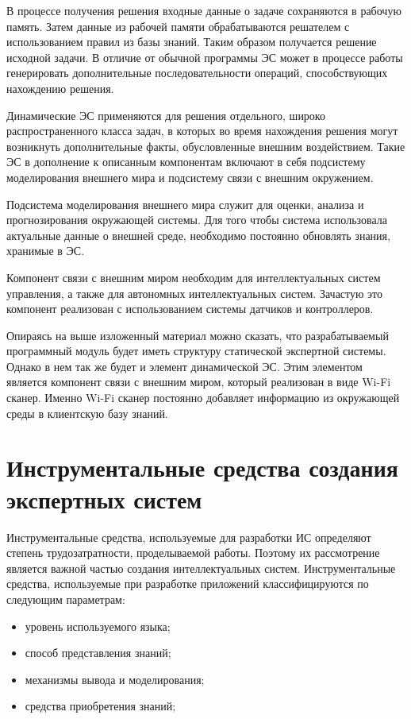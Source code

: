 В процессе получения решения входные данные о задаче сохраняются в рабочую память. Затем данные из рабочей памяти обрабатываются решателем с использованием правил из базы знаний. Таким образом получается решение исходной задачи. В отличие от обычной программы ЭС может в процессе работы генерировать дополнительные последовательности операций, способствующих нахождению решения.
    
Динамические ЭС применяются для решения отдельного, широко распространенного класса задач, в которых во время нахождения решения могут возникнуть дополнительные факты, обусловленные внешним воздействием. Такие ЭС в дополнение к описанным компонентам включают в себя подсистему моделирования внешнего мира и подсистему связи с внешним окружением.

Подсистема моделирования внешнего мира служит для оценки, анализа и прогнозирования окружающей системы. Для того чтобы система использовала актуальные данные о внешней среде, необходимо постоянно обновлять знания, хранимые в ЭС.

Компонент связи с внешним миром необходим для интеллектуальных систем управления, а также для автономных интеллектуальных систем. Зачастую это компонент реализован с использованием системы датчиков и контроллеров.

Опираясь на выше изложенный материал можно сказать, что разрабатываемый программный модуль будет иметь структуру статической экспертной системы. Однако в нем так же будет и элемент динамической ЭС. Этим элементом является компонент связи с внешним миром, который реализован в виде Wi-Fi сканер. Именно Wi-Fi сканер постоянно добавляет информацию из окружающей среды в клиентскую базу знаний.

\section{Инструментальные средства создания экспертных систем}

Инструментальные средства, используемые для разработки ИС определяют степень трудозатратности, проделываемой работы. Поэтому их рассмотрение является важной частью создания интеллектуальных систем. Инструментальные средства, используемые при разработке приложений классифицируются по следующим параметрам:

\begin{itemize}
	\item уровень используемого языка;
	\item способ представления знаний;
	\item механизмы вывода и моделирования;
	\item средства приобретения знаний;
\end{itemize}

